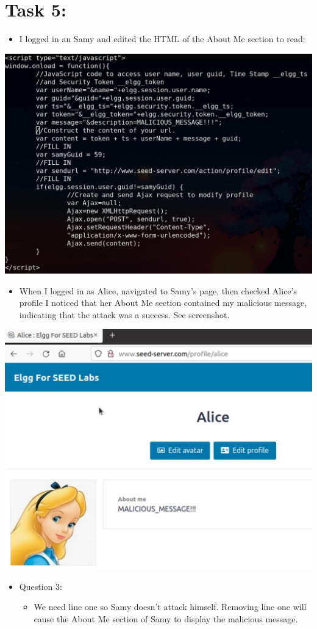 \documentclass[11pt]{article}
\begin{document}
\section*{Task 5:}
\label{sec:org5d821b3}
\begin{itemize}
\item I logged in an Samy and edited the HTML of the About Me section to read:
\end{itemize}
\begin{center}
\includegraphics[width=.9\linewidth]{./images/4.jpg}
\end{center}
\begin{itemize}
\item When I logged in as Alice, navigated to Samy's page, then checked Alice's profile I noticed that her About Me section contained my malicious message, indicating that the attack was a success. See screenshot.
\end{itemize}
\begin{center}
\includegraphics[width=.9\linewidth]{./images/5.jpg}
\end{center}
\begin{itemize}
\item Question 3:
\begin{itemize}
\item We need line one so Samy doesn't attack himself. Removing line one will cause the About Me section of Samy to display the malicious message.
\end{itemize}
\end{itemize}
\end{document}
